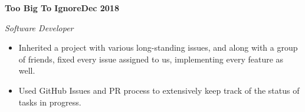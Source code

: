 \vspace{0.1cm}
\textbf{Too Big To Ignore\hfill Dec 2018} \par
\textit{Software Developer} \par
\begin{itemize}
	\item Inherited a project with various long-standing issues, and along with a group of friends, fixed every issue assigned to us, implementing every feature as well.
	\item Used GitHub Issues and PR process to extensively keep track of the status of tasks in progress.
\end{itemize} \par